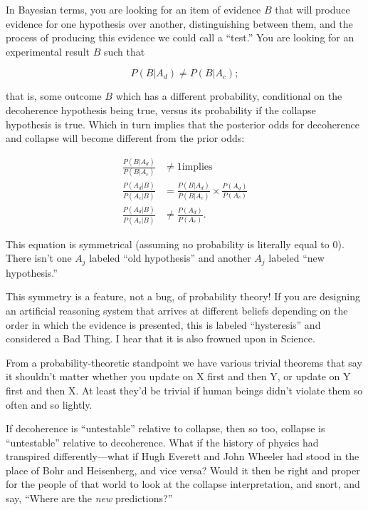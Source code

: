 {
 In Bayesian terms, you are looking for an item of evidence $B$ that
will produce evidence for one hypothesis over another, distinguishing
between them, and the process of producing this evidence we could call
a ``test.'' You are looking for an
experimental result $B$ such that}

\begin{equation*}
 P(B|A_{d}) \neq P(B|A_{c});
\end{equation*}

\bigskip

{
 that is, some outcome $B$ which has a different probability,
conditional on the decoherence hypothesis being true, versus its
probability if the collapse hypothesis is true. Which in turn implies
that the posterior odds for decoherence and collapse will become
different from the prior odds:}

\begin{align*}
  \frac{P(B|A_d)}{P(B|A_c)} &\neq 1 \textrm{implies} \\
  \frac{P(A_d|B)}{P(A_c|B)} &= \frac{P(B|A_d)}{P(B|A_c)} \times \frac{P(A_d)}{P(A_c)} \\
  \frac{P(A_d|B)}{P(A_c|B)} &\neq \frac{P(A_d)}{P(A_c)} .
\end{align*}


\bigskip

{
 This equation is symmetrical (assuming no probability is literally
equal to 0). There isn't one $A_{j}$ labeled
``old hypothesis'' and another
$A_{j}$ labeled ``new
hypothesis.''}

{
 This symmetry is a feature, not a bug, of probability theory! If
you are designing an artificial reasoning system that arrives at
different beliefs depending on the order in which the evidence is
presented, this is labeled
``hysteresis'' and considered a Bad
Thing. I hear that it is also frowned upon in Science.}

{
 From a probability-theoretic standpoint we have various trivial
theorems that say it shouldn't matter whether you
update on X first and then Y, or update on Y first and then X. At least
they'd be trivial if human beings
didn't violate them so often and so lightly.}

{
 If decoherence is
``untestable'' relative to collapse,
then so too, collapse is
``untestable'' relative to
decoherence. What if the history of physics had transpired
differently---what if Hugh Everett and John Wheeler had stood in the
place of Bohr and Heisenberg, and vice versa? Would it then be right
and proper for the people of that world to look at the collapse
interpretation, and snort, and say, ``Where are the
\textit{new} predictions?''}

